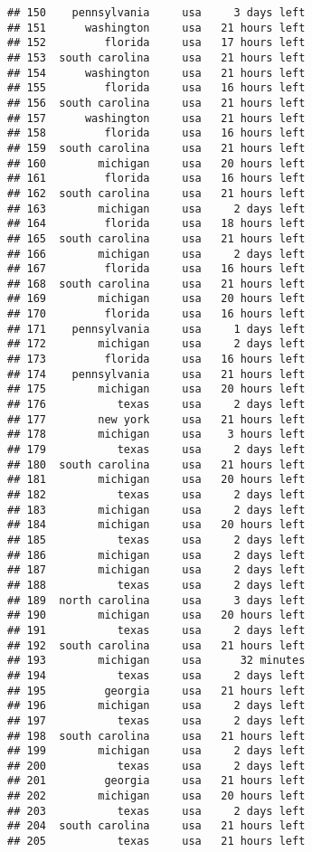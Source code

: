 \documentclass[
]{article}
\begin{document}
\begin{verbatim}
## 150    pennsylvania     usa     3 days left
## 151      washington     usa   21 hours left
## 152         florida     usa   17 hours left
## 153  south carolina     usa   21 hours left
## 154      washington     usa   21 hours left
## 155         florida     usa   16 hours left
## 156  south carolina     usa   21 hours left
## 157      washington     usa   21 hours left
## 158         florida     usa   16 hours left
## 159  south carolina     usa   21 hours left
## 160        michigan     usa   20 hours left
## 161         florida     usa   16 hours left
## 162  south carolina     usa   21 hours left
## 163        michigan     usa     2 days left
## 164         florida     usa   18 hours left
## 165  south carolina     usa   21 hours left
## 166        michigan     usa     2 days left
## 167         florida     usa   16 hours left
## 168  south carolina     usa   21 hours left
## 169        michigan     usa   20 hours left
## 170         florida     usa   16 hours left
## 171    pennsylvania     usa     1 days left
## 172        michigan     usa     2 days left
## 173         florida     usa   16 hours left
## 174    pennsylvania     usa   21 hours left
## 175        michigan     usa   20 hours left
## 176           texas     usa     2 days left
## 177        new york     usa   21 hours left
## 178        michigan     usa    3 hours left
## 179           texas     usa     2 days left
## 180  south carolina     usa   21 hours left
## 181        michigan     usa   20 hours left
## 182           texas     usa     2 days left
## 183        michigan     usa     2 days left
## 184        michigan     usa   20 hours left
## 185           texas     usa     2 days left
## 186        michigan     usa     2 days left
## 187        michigan     usa     2 days left
## 188           texas     usa     2 days left
## 189  north carolina     usa     3 days left
## 190        michigan     usa   20 hours left
## 191           texas     usa     2 days left
## 192  south carolina     usa   21 hours left
## 193        michigan     usa      32 minutes
## 194           texas     usa     2 days left
## 195         georgia     usa   21 hours left
## 196        michigan     usa     2 days left
## 197           texas     usa     2 days left
## 198  south carolina     usa   21 hours left
## 199        michigan     usa     2 days left
## 200           texas     usa     2 days left
## 201         georgia     usa   21 hours left
## 202        michigan     usa   20 hours left
## 203           texas     usa     2 days left
## 204  south carolina     usa   21 hours left
## 205           texas     usa   21 hours left

\end{verbatim}
\end{document}
